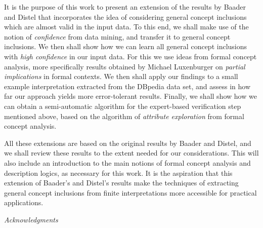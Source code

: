 It is the purpose of this work to present an extension of the results by Baader and Distel
that incorporates the idea of considering general concept inclusions which are almost
valid in the input data.  To this end, we shall make use of the notion of
\emph{confidence} from data mining, and transfer it to general concept inclusions.  We
then shall show how we can learn all general concept inclusions with \emph{high
  confidence} in our input data.  For this we use ideas from formal concept analysis, more
specifically results obtained by Michael Luxenburger on \emph{partial implications} in
formal contexts.  We then shall apply our findings to a small example interpretation
extracted from the DBpedia data set, and assess in how far our approach yields more
error-tolerant results.  Finally, we shall show how we can obtain a semi-automatic
algorithm for the expert-based verification step mentioned above, based on the algorithm
of \emph{attribute exploration} from formal concept analysis.

All these extensions are based on the original results by Baader and Distel, and we shall
review these results to the extent needed for our considerations.  This will also include
an introduction to the main notions of formal concept analysis and description logics, as
necessary for this work.  It is the aspiration that this extension of Baader's and
Distel's results make the techniques of extracting general concept inclusions from finite
interpretations more accessible for practical applications.

\bigskip\noindent%
\textit{Acknowledgments}\hspace*{2em}~

